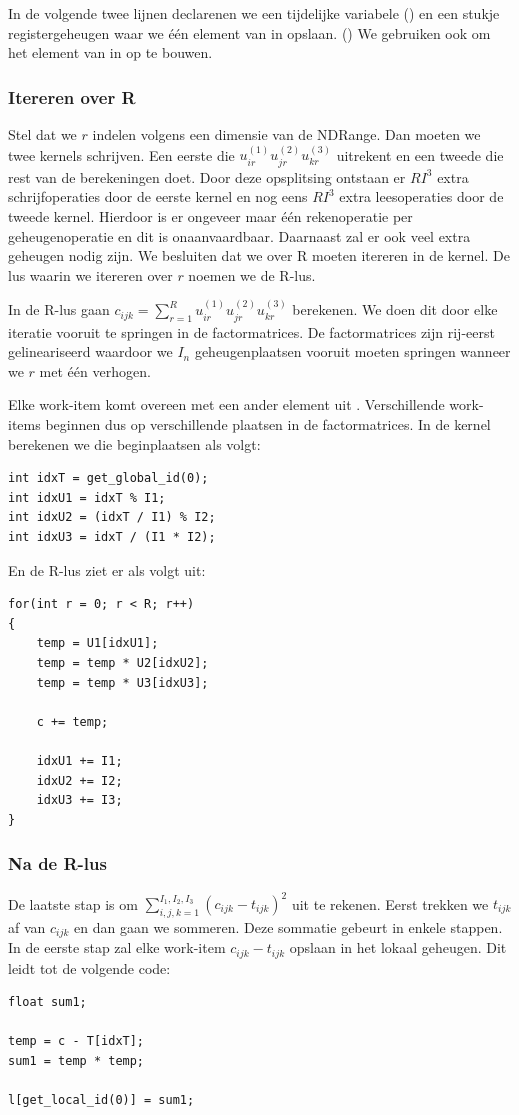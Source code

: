 In de volgende twee lijnen declarenen we een tijdelijke variabele () en een stukje registergeheugen waar we \'e\'en element van \CC{} in opslaan. () We gebruiken  ook om het element van \CC{} in op te bouwen.

\subsubsection{Itereren over R}
Stel dat we $r$ indelen volgens een dimensie van de NDRange. Dan moeten we twee kernels schrijven. Een eerste die $u^{(1)}_{i r} u^{(2)}_{j r} u^{(3)}_{k r}$ uitrekent en een tweede die rest van de berekeningen doet. Door deze opsplitsing ontstaan er $RI^3$ extra schrijfoperaties door de eerste kernel en nog eens $RI^3$ extra leesoperaties door de tweede kernel. Hierdoor is er ongeveer maar \'e\'en rekenoperatie per geheugenoperatie en dit is onaanvaardbaar. Daarnaast zal er ook veel extra geheugen nodig zijn. We besluiten dat we over R moeten itereren in de kernel. De lus waarin we itereren over $r$ noemen we de R-lus.

In de R-lus gaan $c_{ijk} = \sum_{r=1}^{R} u^{(1)}_{i r} u^{(2)}_{j r} u^{(3)}_{k r}$ berekenen. We doen dit door elke iteratie vooruit te springen in de factormatrices. De factormatrices zijn rij-eerst gelineariseerd waardoor we $I_n$ geheugenplaatsen vooruit moeten springen wanneer we $r$ met \'e\'en verhogen.

Elke work-item komt overeen met een ander element uit \CC{}. Verschillende work-items beginnen dus op verschillende plaatsen in de factormatrices. In de kernel berekenen we die beginplaatsen als volgt:

\begin{lstlisting}
int idxT = get_global_id(0);
int idxU1 = idxT % I1;
int idxU2 = (idxT / I1) % I2;
int idxU3 = idxT / (I1 * I2);
\end{lstlisting}

En de R-lus ziet er als volgt uit:
\begin{lstlisting}
for(int r = 0; r < R; r++)
{
    temp = U1[idxU1];
    temp = temp * U2[idxU2];
    temp = temp * U3[idxU3];
    
    c += temp;
    
    idxU1 += I1;
    idxU2 += I2;
    idxU3 += I3;
}
\end{lstlisting}

\subsubsection{Na de R-lus}
\label{calcSum}
De laatste stap is om $\sum_{i,j,k = 1}^{I_1, I_2, I_3} \left(c_{ijk} - t_{ijk}\right)^2$ uit te rekenen. Eerst trekken we $t_{ijk}$ af van $c_{ijk}$ en dan gaan we sommeren. Deze sommatie gebeurt in enkele stappen. In de eerste stap zal elke work-item $c_{ijk} - t_{ijk}$ opslaan in het lokaal geheugen. Dit leidt tot de volgende code:
\begin{lstlisting}
float sum1;

temp = c - T[idxT];
sum1 = temp * temp;

l[get_local_id(0)] = sum1;
\end{lstlisting}

